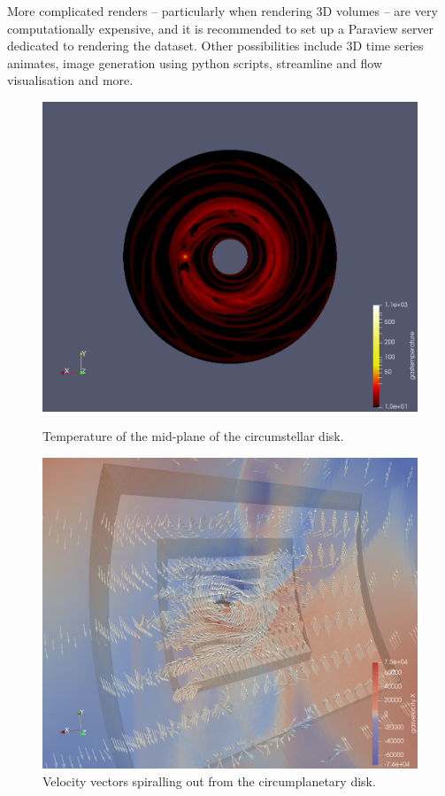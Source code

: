 \documentclass[twocolumn]{aastex62}
\begin{document}
More complicated renders -- particularly when rendering 3D volumes -- are very computationally expensive, and it is recommended to set up a Paraview server dedicated to rendering the dataset.
Other possibilities include 3D time series animates, image generation using python scripts, streamline and flow visualisation and more.
\begin{figure}
	\centering
	\includegraphics[width=0.95\linewidth]{figures/Temp/GasTempMidplane.png}
	\caption{\label{fig:temp} Temperature of the mid-plane of the circumstellar disk.}

	\centering
	\includegraphics[width=0.95\linewidth]{figures/VelGlyphs/VelGlyphs5Circumplanetary.png}
	\caption{\label{fig:vel}Velocity vectors spiralling out from the circumplanetary disk.}
\end{figure}
\end{document}
